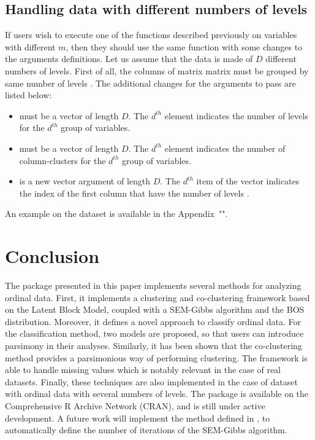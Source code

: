 \subsection{Handling data with different numbers of levels}
If users wish to execute one of the functions described previously on variables with different $m$, then they should use the same function with some changes to the arguments definitions. Let us assume that the data is made of $D$ different numbers of levels. First of all, the columns of matrix matrix  must be grouped by same number of levels . The additional changes for the arguments to pass are listed below:
\begin{itemize}
\item {} must be a vector of length $D$. The $d^{th}$ element indicates the number of levels for the $d^{th}$ group of variables.
\item {} must be a vector of length $D$. The $d^{th}$ element indicates the number of column-clusters for the $d^{th}$ group of variables.
\item {} is a new vector argument of length $D$.  The $d^{th}$ item of the vector indicates the index of the first column that have the number of levels .
\end{itemize}

An example on the  dataset is available in the Appendix~"".


\section{Conclusion}
\label{sec:conclusion}

The  package presented in this paper implements several methods for analyzing ordinal data. First, it implements a clustering and co-clustering framework based on the Latent Block Model, coupled with a SEM-Gibbs algorithm and the BOS distribution. Moreover, it defines a novel approach to classify ordinal data. For the classification method, two models are proposed, so that users can introduce parsimony in their analyses. Similarly, it has been shown that the co-clustering method provides a parsimonious way of performing clustering. The framework is able to handle missing values which is notably relevant in the case of real datasets. Finally, these techniques are also implemented in the case of dataset with ordinal data with several numbers of levels.
The package  is available on the Comprehensive R Archive Network (CRAN), and is still under active development. A future work will implement the method defined in \citet{gelman92}, to automatically define the number of iterations of the SEM-Gibbs algorithm. 

